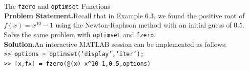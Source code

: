 \documentclass[../main.tex]{subfiles}
\begin{document}
\begin{example} The \texttt{fzero} and \texttt{optimset} Functions\\

    \noindent\textbf{Problem Statement.}\quad Recall that in Example 6.3, we found the positive root of $f (x) = x^{10} - 1$ 
    using the Newton-Raphson method with an initial guess of 0.5. Solve the same problem with \texttt{optimset} and \texttt{fzero}.\\

    \noindent\textbf{Solution.}\quad An interactive MATLAB session can be implemented as follows:\\

    \texttt{>> options = optimset('display','iter');\\
    \indent >> [x,fx] = fzero(@(x) x\textasciicircum10-1,0.5,options)\\}




\end{example}
\end{document}
